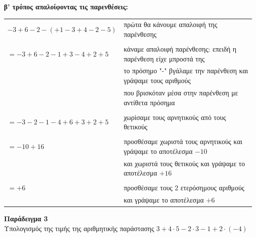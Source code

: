 \documentclass[a4paper,10pt]{report}
\begin{document}
\newpage

\textbf{β' τρόπος απαλοίφοντας τις παρενθέσεις:}\\

\begin{table}[h]
\begin{tabular}{l|l}
$-3+6-2-(+1-3+4-2-5)$ & πρώτα θα κάνουμε απαλοιφή της παρένθεσης                           \\
                      &                                                                    \\
$= -3+6-2-1+3-4+2+5$  & κάναμε απαλοιφή παρένθεσης: επειδή η παρένθεση είχε μπροστά της    \\
                      & το πρόσημο "-" βγάλαμε την παρένθεση και γράψαμε τους αριθμούς     \\
                      & που βρισκόταν μέσα στην παρένθεση με αντίθετα πρόσημα              \\
                      &                                                                    \\
$= -3-2-1-4+6+3+2+5$    & χωρίσαμε τους αρνητικούς από τους θετικούς                         \\
                      &                                                                    \\
$= -10+16$              & προσθέσαμε χωριστά τους αρνητικούς και γράψαμε το αποτέλεσμα $-10$ \\
                      & και χωριστά τους θετικούς και γράψαμε το αποτέλεσμα $+16$          \\
                      &                                                                    \\
$= +6$                  & προσθέσαμε τους 2 ετερόσημους αριθμούς                             \\
                      & και γράψαμε το αποτέλεσμα $+6$                                    
\end{tabular}
\end{table}


\textbf{Παράδειγμα 3} \\
Υπολογισμός της τιμής της αριθμητικής παράστασης  $3+4\cdot 5-2\cdot 3-1+2\cdot(-4)$
\end{document}
